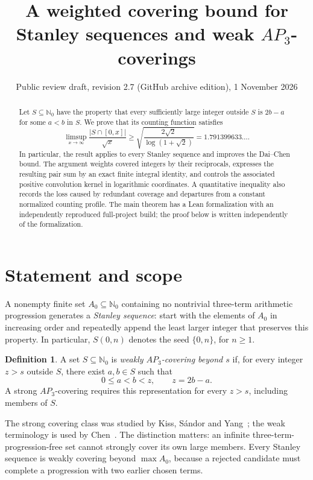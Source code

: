 \documentclass[11pt]{article}
\title{A weighted covering bound for\protect\\Stanley sequences and weak $AP_3$-coverings}
\author{}
\date{Public review draft, revision 2.7 (GitHub archive edition), 1 November 2026}
\theoremstyle{definition}\newtheorem{definition}[theorem]{Definition}
\theoremstyle{remark}\newtheorem{remark}[theorem]{Remark}
\numberwithin{equation}{section}
\newcommand{\N}{\mathbb N_0}
\begin{document}
\maketitle
\thispagestyle{fancy}
\begin{abstract}
Let $S\subseteq\N$ have the property that every sufficiently large integer outside $S$ is $2b-a$ for some $a<b$ in $S$. We prove that its counting function satisfies
\[
\limsup_{x\to\infty}\frac{|S\cap[0,x]|}{\sqrt x}
\ge \sqrt{\frac{2\sqrt2}{\log(1+\sqrt2)}}=1.791399633\ldots.
\]
In particular, the result applies to every Stanley sequence and improves the Dai--Chen bound. The argument weights covered integers by their reciprocals, expresses the resulting pair sum by an exact finite integral identity, and controls the associated positive convolution kernel in logarithmic coordinates. A quantitative inequality also records the loss caused by redundant coverage and departures from a constant normalized counting profile. The main theorem has a Lean formalization with an independently reproduced full-project build; the proof below is written independently of the formalization.
\end{abstract}

\section{Statement and scope}
A nonempty finite set $A_0\subseteq\N$ containing no nontrivial three-term arithmetic progression generates a \emph{Stanley sequence}: start with the elements of $A_0$ in increasing order and repeatedly append the least larger integer that preserves this property. In particular, $S(0,n)$ denotes the seed $\{0,n\}$, for $n\ge1$.

\begin{definition}
A set $S\subseteq\N$ is \emph{weakly $AP_3$-covering beyond $s$} if, for every integer $z>s$ outside $S$, there exist $a,b\in S$ such that
\[
0\le a<b<z,\qquad z=2b-a.
\]
A strong $AP_3$-covering requires this representation for every $z>s$, including members of $S$.
\end{definition}
The strong covering class was studied by Kiss, S\'andor and Yang~\cite{KSY}; the weak terminology is used by Chen~\cite{Chen}. The distinction matters: an infinite three-term-progression-free set cannot strongly cover its own large members. Every Stanley sequence is weakly covering beyond $\max A_0$, because a rejected candidate must complete a progression with two earlier chosen terms.
\end{document}
